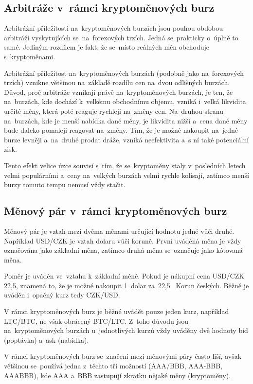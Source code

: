 \documentclass[thesis=B,czech]{FITthesis}[2019/03/21]
\begin{document}
\subsection{Arbitráže v~rámci kryptoměnových burz}
Arbitrážní příležitosti na~kryptoměnových burzách jsou pouhou obdobou arbitráží vyskytujících se~na~forexových trzích. Jedná se~prakticky o~úplně to samé. Jediným rozdílem je fakt, že se~místo reálných měn obchoduje s~kryptoměnami. 

Arbitrážní příležitost na~kryptoměnových burzách (podobně jako na~forexových trzích) vznikne většinou na~základě rozdílu cen na~dvou odlišných burzách. Důvod, proč arbitráže vznikají právě na~kryptoměnových burzách, je ten, že na~burzách, kde dochází k~velkému obchodnímu objemu, vzniká i~velká likvidita určité měny, která poté reaguje rychleji na~změny cen. Na~druhou stranu na~burzách, kde je menší nabídka dané měny, je likvidita nižší a~cena dané měny bude daleko pomaleji reagovat na~změny. Tím, že je možné nakoupit na~jedné burze levněji a~na~druhé prodat dráže, vzniká neefektivita a~s ní také potenciální zisk.

Tento efekt velice úzce souvisí s~tím, že se~kryptoměny staly v~posledních letech velmi populárními a~ceny na~velkých burzách velmi rychle kolísají, zatímco menší burzy tomuto tempu nemusí vždy stačit. \cite{finder}

\subsection{Měnový pár v~rámci kryptoměnových burz}
Měnový pár je vztah mezi dvěma měnami určující hodnotu jedné vůči druhé. Například USD/CZK je vztah dolaru vůči koruně. První uváděná měna je vždy označována jako základní měna, zatímco druhá měna se~označuje jako kótovaná měna. \cite{Capital_menovy_par} 

Poměr je uváděn ve~vztahu k~základní měně. Pokud je nákupní cena USD/CZK 22,5, znamená to, že je možné nakoupit 1~dolar za~22,5~ Korun českých. Běžně je uváděn i~opačný kurz tedy CZK/USD. \cite{Capital_menovy_par} 

V rámci kryptoměnových burz je běžné uvádět pouze jeden kurz, například LTC/BTC, ne však obrácený BTC/LTC. Z~toho důvodu jsou na~kryptoměnových burzách u~jednotlivých kurzů vždy uváděny dvě hodnoty bid (poptávka) a~ask (nabídka). 

V rámci kryptoměnových burz se~značení mezi měnovými páry často liší, avšak většinou se~používá jedna z~těchto tří možností (AAA/BBB, AAA-BBB, AAABBB), kde AAA a~BBB zastupují zkratku nějaké měny (kryptoměny).
\end{document}
